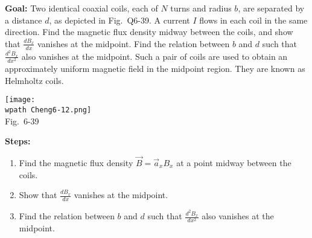\documentclass[../../header.tex]{subfiles}
\begin{document}
\textbf{Goal:} Two identical coaxial coils, each of $N$ turns and radius $b$, are separated by a distance $d$, as depicted in Fig.~Q6-39. A current $I$ flows in each coil in the same direction. Find the magnetic flux density midway between the coils, and show that $\frac{d B_x}{dx}$ vanishes at the midpoint. Find the relation between $b$ and $d$ such that $\frac{d^2 B_x}{dx^2}$ also vanishes at the midpoint. Such a pair of coils are used to obtain an approximately uniform magnetic field in the midpoint region. They are known as Helmholtz coils.
\begin{center}
\texttt{[image: \\wpath Cheng6-12.png]}\\
Fig.~6-39
\end{center}
\textbf{Steps:} 
\begin{enumerate}
\item Find the magnetic flux density $\vec{B} = \vec{a}_x B_x$ at a point midway between the coils.\\

\item Show that $\frac{d B_x}{dx}$ vanishes at the midpoint.\\

\item Find the relation between $b$ and $d$ such that $\frac{d^2 B_x}{dx^2}$ also vanishes at the midpoint.\\
\end{enumerate}
\end{document}
